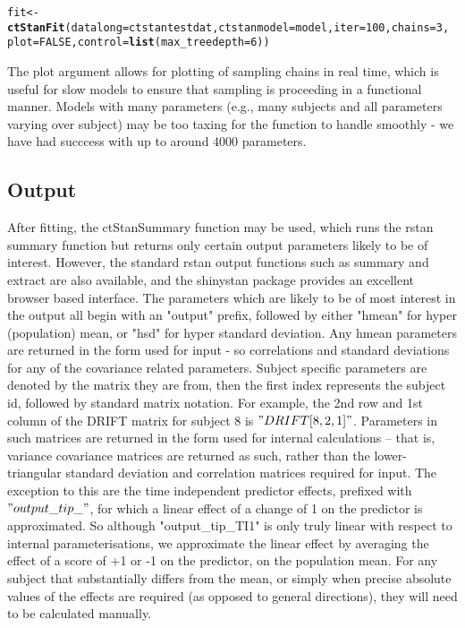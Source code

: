 \documentclass[nojss]{jss}\usepackage[]{graphicx}\usepackage[]{color}
\makeatletter
\newcommand{\hlnum}[1]{\textcolor[rgb]{0.686,0.059,0.569}{#1}}%
\newcommand{\hlstd}[1]{\textcolor[rgb]{0.345,0.345,0.345}{#1}}%
\newcommand{\hlkwb}[1]{\textcolor[rgb]{0.69,0.353,0.396}{#1}}%
\newcommand{\hlkwc}[1]{\textcolor[rgb]{0.333,0.667,0.333}{#1}}%
\newcommand{\hlkwd}[1]{\textcolor[rgb]{0.737,0.353,0.396}{\textbf{#1}}}%
\newenvironment{kframe}{%
 \def\at@end@of@kframe{}%
 \ifinner\ifhmode%
  \def\at@end@of@kframe{\end{minipage}}%
  \begin{minipage}{\columnwidth}%
 \fi\fi%
 \def\FrameCommand##1{\hskip\@totalleftmargin \hskip-\fboxsep
 \colorbox{shadecolor}{##1}\hskip-\fboxsep
     \hskip-\linewidth \hskip-\@totalleftmargin \hskip\columnwidth}%
 \MakeFramed {\advance\hsize-\width
   \@totalleftmargin\z@ \linewidth\hsize
   \@setminipage}}%
 {\par\unskip\endMakeFramed%
 \at@end@of@kframe}
\newenvironment{knitrout}{}{} %
\makeatother
\begin{document}
\begin{knitrout}\small
{}\color{fgcolor}\begin{kframe}
\begin{alltt}
\hlstd{fit}\hlkwb{<-}\hlkwd{ctStanFit}\hlstd{(}\hlkwc{datalong} \hlstd{= ctstantestdat,} \hlkwc{ctstanmodel} \hlstd{= model,} \hlkwc{iter}\hlstd{=}\hlnum{100}\hlstd{,} \hlkwc{chains}\hlstd{=}\hlnum{3}\hlstd{,}
  \hlkwc{plot}\hlstd{=}\hlnum{FALSE}\hlstd{,} \hlkwc{control}\hlstd{=}\hlkwd{list}\hlstd{(}\hlkwc{max_treedepth} \hlstd{=} \hlnum{6}\hlstd{))}
\end{alltt}
\end{kframe}
\end{knitrout}

The plot argument allows for plotting of sampling chains in real time, which is useful for slow models to ensure that sampling is proceeding in a functional manner. Models with many parameters (e.g., many subjects and all parameters varying over subject) may be too taxing for the function to handle smoothly - we have had succcess with up to around 4000 parameters.  

\subsection{Output}
After fitting, the ctStanSummary function may be used, which runs the rstan summary function but returns only certain output parameters likely to be of interest. However, the standard rstan output functions such as summary and extract are also available, and the shinystan package provides an excellent browser based interface. The parameters which are likely to be of most interest in the output all begin with an "output" prefix, followed by either "hmean" for hyper (population) mean, or "hsd" for hyper standard deviation. Any hmean parameters are returned in the form used for input - so correlations and standard deviations for any of the covariance related parameters. Subject specific parameters are denoted by the matrix they are from, then the first index represents the subject id, followed by standard matrix notation. For example, the 2nd row and 1st column of the DRIFT matrix for subject 8 is $"DRIFT[8,2,1]"$. Parameters in such matrices are returned in the form used for internal calculations -- that is, variance covariance matrices are returned as such, rather than the lower-triangular standard deviation and correlation matrices required for input. The exception to this are the time independent predictor effects, prefixed with $"output\_tip\_"$, for which a linear effect of a change of 1 on the predictor is approximated. So although "output\_tip\_TI1" is only truly linear with respect to internal parameterisations, we approximate the linear effect by averaging the effect of a score of +1 or -1 on the predictor, on the population mean. For any subject that substantially differs from the mean, or simply when precise absolute values of the effects are required (as opposed to general directions), they will need to be calculated manually.
\end{document}
